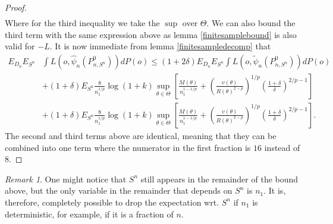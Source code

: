 \documentclass[11pt, a4paper]{article}
\theoremstyle{definition}
\theoremstyle{remark}
\newtheorem*{remark}{Remark}
\newcommand{\btheta}{\theta}
\newcommand{\la}{\psi}
\newcommand{\Sn}{S^n}
\begin{document}
\begin{proof}[Proof]
\begin{align*}
\end{align*}
Where for the third inequality we take the $ \sup $ over $ \Theta $. We can also bound the third term with the same expression above as lemma \ref{finitesamplebound} is also valid for $ -L $. It is now immediate from lemma \ref{finitesampledecomp} that 
\begin{align*}
    E_{D_n} E_{\Sn} &\int L(o, \hat{\la}_n(P_{n, \Sn}^{0})) d P(o) \leq (1 + 2 \delta) E_{D_n} E_{\Sn} \int L(o, \tilde{\la}_n(P_{n, \Sn}^{0})) d P(o) \\
                    &+ (1 + \delta) E_{\Sn}\frac{8}{n_1^{1/p}} \log(1 + k) \sup_{\btheta \in \Theta} \left[ \frac{M(\btheta)}{n_1^{1-1/p}} + \left( \frac{v(\btheta)}{R(\btheta)^{2-p}} \right)^{1/p}\left( \frac{1 + \delta}{\delta}  \right)^{2/p-1} \right]\\
                    &+ (1 + \delta) E_{\Sn}\frac{8}{n_1^{1/p}} \log(1 + k) \sup_{\btheta \in \Theta} \left[ \frac{M(\btheta)}{n_1^{1-1/p}} + \left( \frac{v(\btheta)}{R(\btheta)^{2-p}} \right)^{1/p}\left( \frac{1 + \delta}{\delta}  \right)^{2/p-1} \right].
\end{align*}
The second and third terms above are identical, meaning that they can be combined into one term where the numerator in the first fraction is $ 16 $ instead of $ 8 $. 
\end{proof}

\begin{remark}
One might notice that $ \Sn $ still appears in the remainder of the bound above, but the only variable in the remainder that depends on $ \Sn $ is $ n_1 $. It is, therefore, completely possible to drop the expectation wrt. $ \Sn $ if $ n_1 $ is deterministic, for example, if it is a fraction of $ n $.  
\end{remark}
\end{document}
